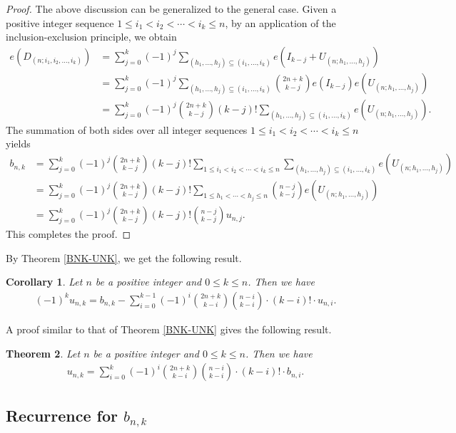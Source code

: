 \documentclass[reqno, 12pt]{article}
\newtheorem{thm}{Theorem}[section]
\newtheorem{cor}[thm]{Corollary}
\theoremstyle{mydefinition}
\theoremstyle{myremark}
\numberwithin{algorithm}{section}
\begin{document}
\begin{proof}
The above discussion can be generalized to the general case.
Given a positive integer sequence $1\leq i_1<i_2<\cdots <i_k\leq n$, by an application of the inclusion-exclusion principle, we obtain
\begin{align*}
e(D_{(n; i_1,i_2,\ldots,i_k)})&=\sum_{j=0}^k (-1)^j \sum_{(h_1,\ldots,h_j)\subseteq (i_1,\ldots,i_k)} e(I_{k-j}+U_{(n; h_1,\ldots,h_j)})
\\ &=\sum_{j=0}^k (-1)^j \sum_{(h_1,\ldots,h_j)\subseteq (i_1,\ldots,i_k)} \binom{2n+k}{k-j} e(I_{k-j}) e(U_{(n; h_1,\ldots,h_j)})
\\ &=\sum_{j=0}^k (-1)^j \binom{2n+k}{k-j} (k-j)! \sum_{(h_1,\ldots,h_j)\subseteq (i_1,\ldots,i_k)} e(U_{(n; h_1,\ldots,h_j)}).
\end{align*}
The summation of both sides over all integer sequences $1\leq i_1<i_2<\cdots <i_k\leq n$ yields
\begin{align*}
b_{n,k}&=\sum_{j=0}^k (-1)^j \binom{2n+k}{k-j} (k-j)! \sum_{1\leq i_1<i_2<\cdots <i_k\leq n} \sum_{(h_1,\ldots,h_j)\subseteq (i_1,\ldots,i_k)} e(U_{(n; h_1,\ldots,h_j)})
\\ &= \sum_{j=0}^k (-1)^j \binom{2n+k}{k-j} (k-j)! \sum_{1\leq h_1<\cdots <h_j\leq n} \binom{n-j}{k-j} e(U_{(n; h_1,\ldots,h_j)})
\\ &= \sum_{j=0}^k (-1)^j \binom{2n+k}{k-j} (k-j)! \binom{n-j}{k-j} u_{n,j}.
\end{align*}
This completes the proof.
\end{proof}

By Theorem \ref{BNK-UNK}, we get the following result.
\begin{cor}
Let $n$ be a positive integer and $0\leq k\leq n$. Then we have
\begin{align*}
(-1)^ku_{n,k}=b_{n,k}-\sum_{i=0}^{k-1} (-1)^i \binom{2n+k}{k-i}\binom{n-i}{k-i}\cdot (k-i)!\cdot u_{n,i}.
\end{align*}
\end{cor}


A proof similar to that of Theorem \ref{BNK-UNK} gives the following result.
\begin{thm}\label{UNK-To-BNK}
Let $n$ be a positive integer and $0\leq k\leq n$. Then we have
\begin{align*}
u_{n,k}=\sum_{i=0}^k (-1)^i \binom{2n+k}{k-i}\binom{n-i}{k-i}\cdot (k-i)!\cdot b_{n,i}.
\end{align*}
\end{thm}


\subsection{Recurrence for $b_{n,k}$}\label{Section-Recurrence-for-bnk}
\end{document}
